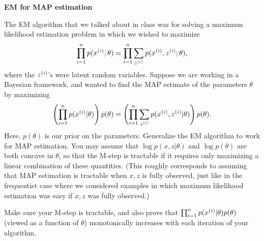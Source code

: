 \item {} {\bf EM for MAP estimation}

The EM algorithm that we talked about in class was for solving a 
maximum likelihood estimation problem in which we wished to maximize
\[
 \prod_{i=1}^{n} p(x^{(i)};\theta) = 
 \prod_{i=1}^{n} \sum_{z^{(i)}} p(x^{(i)}, z^{(i)};\theta),
\]
where the $z^{(i)}$'s were latent random variables. 
Suppose we are working
in a Bayesian framework, and wanted to find the MAP estimate of the parameters
$\theta$ by maximizing 
\[
 \left( \prod_{i=1}^{n} p(x^{(i)}|\theta) \right) p(\theta) = 
 \left( \prod_{i=1}^{n} \sum_{z^{(i)}} p(x^{(i)}, z^{(i)}|\theta)\right) p(\theta).
\]
Here, $p(\theta)$ is our prior on the parameters.  Generalize the EM algorithm to 
work for MAP estimation. You may assume that $\log p(x,z|\theta)$ and $\log p(\theta)$ 
are both concave in $\theta$, so that the M-step is tractable if it 
requires only maximizing a linear combination of these quantities.  
(This roughly corresponds to assuming that MAP estimation is tractable 
when $x,z$ is fully observed, just like in the frequentist case
where we considered examples in which maximum likelihood estimation was easy if $x,z$ was
fully observed.)

Make sure your M-step is tractable, and also prove that 
$\prod_{i=1}^{n} p(x^{(i)}|\theta) p(\theta)$ (viewed as a function of $\theta$) 
monotonically increases with each iteration of your algorithm.  

\ifnum{} {
  
} \fi
